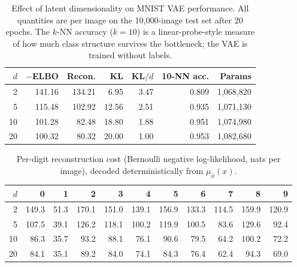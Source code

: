 \begin{table}[t]
\centering
\caption{Effect of latent dimensionality on MNIST VAE performance. All quantities are per image on the 10{,}000-image test set after 20 epochs. The $k$-NN accuracy ($k=10$) is a linear-probe-style measure of how much class structure survives the bottleneck; the VAE is trained without labels.}
\label{tab:vae-latent-dim}
\begin{tabular}{rrrrrrr}
\toprule
$d$ & $-$ELBO & Recon. & KL & KL$/d$ & 10-NN acc. & Params \\
\midrule
2 & 141.16 & 134.21 & 6.95 & 3.47 & 0.809 & 1{,}068{,}820 \\
5 & 115.48 & 102.92 & 12.56 & 2.51 & 0.935 & 1{,}071{,}130 \\
10 & 101.28 & 82.48 & 18.80 & 1.88 & 0.951 & 1{,}074{,}980 \\
20 & 100.32 & 80.32 & 20.00 & 1.00 & 0.953 & 1{,}082{,}680 \\
\bottomrule
\end{tabular}
\end{table}

\begin{table}[t]
\centering
\caption{Per-digit reconstruction cost (Bernoulli negative log-likelihood, nats per image), decoded deterministically from $\mu_\phi(x)$.}
\label{tab:vae-per-digit}
\begin{tabular}{rrrrrrrrrrr}
\toprule
$d$ & 0 & 1 & 2 & 3 & 4 & 5 & 6 & 7 & 8 & 9 \\
\midrule
2 & 149.3 & 51.3 & 170.1 & 151.0 & 139.1 & 156.9 & 133.3 & 114.5 & 159.9 & 120.9 \\
5 & 107.5 & 39.1 & 126.2 & 118.1 & 100.2 & 119.9 & 100.5 & 83.6 & 129.6 & 92.4 \\
10 & 86.3 & 35.7 & 93.2 & 88.1 & 76.1 & 90.6 & 79.5 & 64.2 & 100.2 & 72.2 \\
20 & 84.1 & 35.1 & 89.2 & 84.0 & 74.1 & 84.3 & 76.4 & 62.4 & 94.3 & 69.0 \\
\bottomrule
\end{tabular}
\end{table}